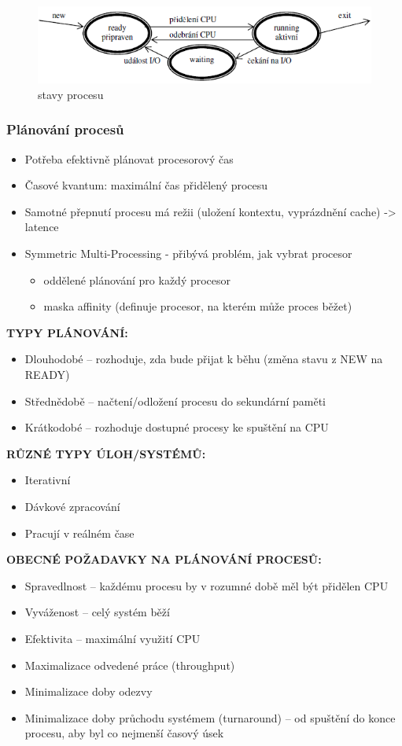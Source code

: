 \documentclass[10pt,a4paper]{article}
\begin{document}
\begin{figure} [h]
		\includegraphics[scale=0.85]{img/stavy_procesu.png}
		\caption{stavy procesu}
\end{figure}

\subsubsection{Plánování procesů}
\begin{itemize}
	\item Potřeba efektivně plánovat procesorový čas
	\item Časové kvantum: maximální čas přidělený procesu
	\item Samotné přepnutí procesu má režii (uložení kontextu, vyprázdnění cache) -> latence
	\item Symmetric Multi-Processing - přibývá problém, jak vybrat procesor
	\begin{itemize}
		\item oddělené plánování pro každý procesor
		\item maska affinity (definuje procesor, na kterém může proces běžet)
	\end{itemize}
\end{itemize}

\textbf{TYPY PLÁNOVÁNÍ:}
\begin{itemize}
	\item Dlouhodobé – rozhoduje, zda bude přijat k běhu (změna stavu z NEW na READY)
	\item Střednědobě – načtení/odložení procesu do sekundární paměti
	\item Krátkodobé – rozhoduje dostupné procesy ke spuštění na CPU
\end{itemize}

\textbf{RŮZNÉ TYPY ÚLOH/SYSTÉMŮ:}
\begin{itemize}
	\item Iterativní
	\item Dávkové zpracování
	\item Pracují v reálném čase
\end{itemize}

\textbf{OBECNÉ POŽADAVKY NA PLÁNOVÁNÍ PROCESŮ:}
\begin{itemize}
	\item Spravedlnost – každému procesu by v rozumné době měl být přidělen CPU
	\item Vyváženost – celý systém běží
	\item Efektivita – maximální využití CPU
	\item Maximalizace odvedené práce (throughput)
	\item Minimalizace doby odezvy
	\item Minimalizace doby průchodu systémem (turnaround) – od spuštění do konce procesu, aby byl co nejmenší časový úsek
\end{itemize}
\end{document}

